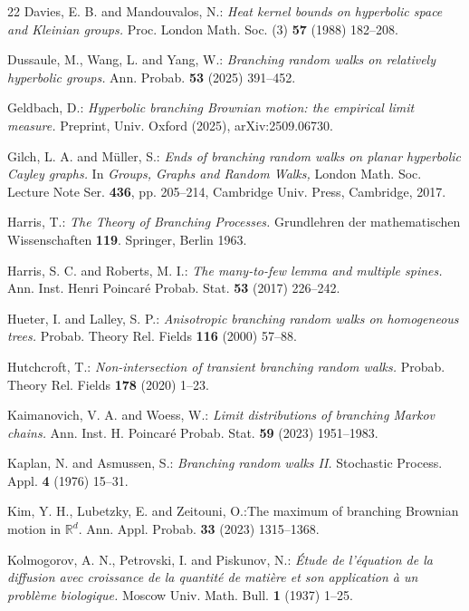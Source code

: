 \documentclass[12pt]{amsart}
\newcommand\R{\mathbb R}
\numberwithin{theorem}{section}
\theoremstyle{definition}
\begin{document}
\begin{thebibliography}{22}
  Davies, E. B. and Mandouvalos, N.: \emph{Heat kernel bounds on hyperbolic 
space and Kleinian groups.}
Proc. London Math. Soc. (3) {\bf 57} (1988) 182--208.

 Dussaule, M., Wang, L. and Yang, W.: \emph{Branching random walks 
on relatively hyperbolic groups.} Ann. Probab. {\bf 53} (2025) %
391--452.


 Geldbach, D.: \emph{Hyperbolic branching Brownian motion: the 
empirical limit measure.} Preprint, Univ. Oxford (2025), 
arXiv:2509.06730. 

 Gilch, L. A. and M\"uller, S.: \emph{Ends of branching random walks on planar 
hyperbolic Cayley graphs.} In \emph{Groups, Graphs and Random Walks,} London Math. Soc. Lecture Note 
Ser. {\bf 436}, pp. 205--214, Cambridge Univ. Press, Cambridge, 2017.

 Harris, T.: \emph{The Theory of Branching Processes.} Grundlehren der 
mathematischen Wissenschaften {\bf 119}. Springer, Berlin 1963. 

 Harris, S. C. and Roberts, M. I.: \emph{The many-to-few lemma 
and multiple spines.}
Ann. Inst. Henri Poincar\'e Probab. Stat. {\bf 53} (2017) %
226--242.

 Hueter, I. and Lalley, S. P.: \emph{Anisotropic branching random walks on 
homogeneous trees.} Probab. Theory Rel. Fields {\bf 116} (2000) 57--88.

 Hutchcroft, T.: \emph{Non-intersection of transient branching random walks.} 
Probab. Theory Rel. Fields {\bf 178}  (2020) 1--23.

 Kaimanovich, V. A. and Woess, W.: \emph{Limit distributions of branching Markov 
chains.} Ann. Inst. H. Poincar\'e Probab. Stat. {\bf 59} (2023) 1951--1983.

 Kaplan, N. and Asmussen, S.: \emph{Branching random walks II.}
Stochastic Process. Appl. {\bf 4} (1976) 15--31.

 Kim, Y. H., Lubetzky, E. and Zeitouni, O.:{The maximum of branching 
Brownian motion in $\R^d$.} Ann. Appl. Probab. {\bf 33} (2023) 1315--1368.

 Kolmogorov, A. N., Petrovski, I. and Piskunov, N.: \emph{\'Etude de l’\'equation de
la diffusion avec croissance de la quantit\'e de mati\`ere et son application \`a un probl\`eme
biologique.} Moscow Univ. Math. Bull. {\bf 1} (1937) 1--25.


\end{thebibliography}
\end{document}
